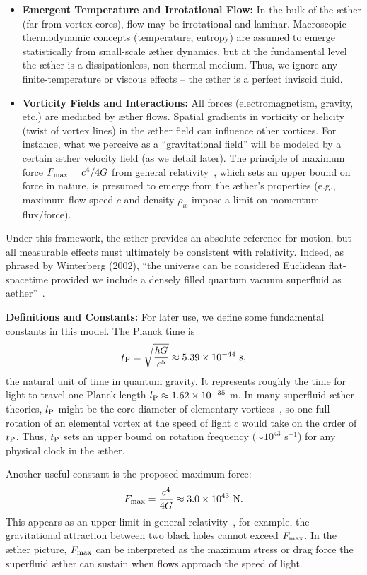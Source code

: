 \begin{itemize}
    \item \textbf{Emergent Temperature and Irrotational Flow:} In the bulk of the æther (far from vortex cores), flow may be irrotational and laminar. Macroscopic thermodynamic concepts (temperature, entropy) are assumed to emerge statistically from small-scale æther dynamics, but at the fundamental level the æther is a dissipationless, non-thermal medium. Thus, we ignore any finite-temperature or viscous effects – the æther is a perfect inviscid fluid.

    \item \textbf{Vorticity Fields and Interactions:} All forces (electromagnetism, gravity, etc.) are mediated by æther flows. Spatial gradients in vorticity or helicity (twist of vortex lines) in the æther field can influence other vortices. For instance, what we perceive as a “gravitational field” will be modeled by a certain æther velocity field (as we detail later). The principle of maximum force $F_{\rm max} = c^4 / 4G$ from general relativity~\cite{Schiller2022-maxforce}, which sets an upper bound on force in nature, is presumed to emerge from the æther’s properties (e.g., maximum flow speed $c$ and density $\rho_{\text{\ae}}$ impose a limit on momentum flux/force).
\end{itemize}

Under this framework, the æther provides an absolute reference for motion, but all measurable effects must ultimately be consistent with relativity. Indeed, as phrased by Winterberg (2002), ``the universe can be considered Euclidean flat-spacetime provided we include a densely filled quantum vacuum superfluid as aether''~\cite{Winterberg2002-PlanckAether}.

\textbf{Definitions and Constants:} For later use, we define some fundamental constants in this model. The Planck time is
\[
    t_{\rm P} = \sqrt{\frac{\hbar G}{c^5}} \approx 5.39\times10^{-44}\ \text{s},
\]
the natural unit of time in quantum gravity. It represents roughly the time for light to travel one Planck length $l_{\rm P} \approx 1.62\times10^{-35}$ m. In many superfluid-æther theories, $l_{\rm P}$ might be the core diameter of elementary vortices~\cite{Winterberg2002-PlanckAether}, so one full rotation of an elemental vortex at the speed of light $c$ would take on the order of $t_{\rm P}$. Thus, $t_{\rm P}$ sets an upper bound on rotation frequency ($\sim 10^{43}$ s$^{-1}$) for any physical clock in the æther.

Another useful constant is the proposed maximum force:
\[
    F_{\rm max} = \frac{c^4}{4G} \approx 3.0\times10^{43}\ \text{N}.
\]
This appears as an upper limit in general relativity~\cite{Schiller2022-maxforce}, for example, the gravitational attraction between two black holes cannot exceed $F_{\rm max}$. In the æther picture, $F_{\rm max}$ can be interpreted as the maximum stress or drag force the superfluid æther can sustain when flows approach the speed of light.

